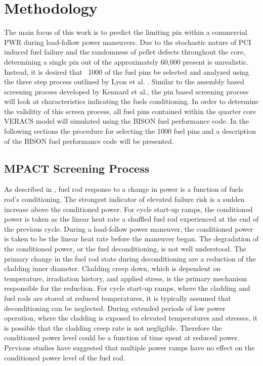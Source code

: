 \documentclass[edeposit,fullpage,11pt]{uiucthesis2009}
\begin{document}
\chapter{Methodology}
The main focus of this work is to predict the limiting pin within a commercial \gls{PWR} during load-follow power maneuvers.
Due to the stochastic nature of \gls{PCI} induced fuel failure and the randomness of pellet defects throughout the core, determining a single pin out of the approximately 60,000 present is unrealistic.
Instead, it is desired that ~1000 of the fuel pins be selected and analyzed using the three step process outlined by Lyon et al. \cite{lyon_pci_2013}.
Similar to the assembly based screening process developed by Kennard et al., the pin based screening process will look at characteristics indicating the fuels conditioning.
In order to determine the validitiy of this screen process, all fuel pins contained within the quarter core \gls{VERACS} model will simulated using the BISON fuel performance code.
In the following sections the procedure for selecting the 1000 fuel pins and a description of the BISON fuel performance code will be presented.

\section{MPACT Screening Process}

As described in \cite{capps_evaluation,kennard_pci}, fuel rod response to a change in power is a function of fuels rod's conditioning. 
The strongest indicator of elevated failure risk is a sudden increase above the conditioned power.
For cycle start-up ramps, the conditioned power is taken as the linear heat rate a shuffled fuel rod experienced at the end of the previous cycle.
During a load-follow power maneuver, the conditioned power is taken to be the linear heat rate before the maneuver began.
The degradation of the conditioned power, or the fuel deconditioning, is not well understood.
The primary change in the fuel rod state during deconditioning are a reduction of the cladding inner diameter.
Cladding creep down, which is dependent on temperature, irradiation history, and applied stress, is the primary mechanism responsible for the reduction.  
For cycle start-up ramps, where the cladding and fuel rods are stored at reduced temperatures, it is typically assumed that deconditioning can be neglected.
During extended periods of low power operation, where the cladding is exposed to elevated temperatures and stresses, it is possible that the cladding creep rate is not negligible.
Therefore the conditioned power level could be a function of time spent at reduced power.
Previous studies \cite{galrtner_survey_1987} have suggested that multiple power ramps have no effect on the conditioned power level of the fuel rod.  
\end{document}
